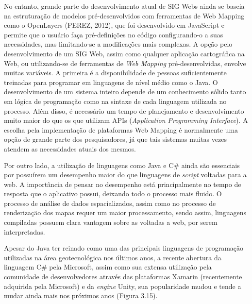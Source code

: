 		No entanto, grande parte do desenvolvimento atual de SIG Webs ainda se baseia na estruturação de modelos pré-desenvolvidos com ferramentas de Web Mapping como o OpenLayers (PEREZ, 2012), que foi desenvolvido em JavaScript e permite que o usuário faça pré-definições no código configurando-o a suas necessidades, mas limitando-se a modificações mais complexas. A opção pelo desenvolvimento de um SIG Web, assim como qualquer aplicação cartográfica na Web, ou utilizando-se de ferramentas de \textit{Web Mapping} pré-desenvolvidas, envolve muitas variáveis. A primeira é a disponibilidade de pessoas suficientemente treinadas para programar em linguagens de nível médio como o Java. O desenvolvimento de um sistema inteiro depende de um conhecimento sólido tanto em lógica de programação como na sintaxe de cada linguagem utilizada no processo. Além disso, é necessário um tempo de planejamento e desenvolvimento muito maior do que os que utilizam APIs (\textit{Application Programming Interface}). A escolha pela implementação de plataformas Web Mapping é normalmente uma opção de grande parte dos pesquisadores, já que tais sistemas muitas vezes atendem as necessidades atuais dos mesmos. 
		
		Por outro lado, a utilização de linguagens como Java e C\# ainda são essenciais por possuírem um desempenho maior do que linguagens de \textit{script} voltadas para a web. A importância de pensar no desempenho está principalmente no tempo de resposta que o aplicativo possui, deixando todo o processo mais fluido. O processo de análise de dados espacializados, assim como no processo de renderização dos mapas requer um maior processamento, sendo assim, linguagens compiladas possuem clara vantagem sobre as voltadas a web, por serem interpretadas.
		
		Apesar do Java ter reinado como uma das principais linguagens de programação utilizadas na área geotecnológica nos últimos anos, a recente abertura da linguagem C\# pela Microsoft, assim como sua extensa utilização pela comunidade de desenvolvedores através das plataformas Xamarin (recentemente adquirida pela Microsoft) e da \textit{engine} Unity, sua popularidade mudou e tende a mudar ainda mais nos próximos anos (Figura 3.15).
		

